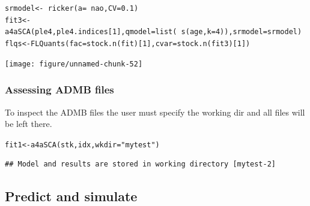 \documentclass[a4paper,english,10pt]{article}\usepackage[]{graphicx}\usepackage[]{color}
\makeatletter
\newcommand{\hlnum}[1]{\textcolor[rgb]{0.2,0.2,0.2}{#1}}%
\newcommand{\hlstr}[1]{\textcolor[rgb]{0.2,0.2,0.2}{#1}}%
\newcommand{\hlopt}[1]{\textcolor[rgb]{0.2,0.2,0.2}{#1}}%
\newcommand{\hlstd}[1]{\textcolor[rgb]{0,0,0}{#1}}%
\newcommand{\hlkwb}[1]{\textcolor[rgb]{0.361,0.506,0.596}{#1}}%
\newcommand{\hlkwc}[1]{\textcolor[rgb]{0.361,0.506,0.596}{#1}}%
\newcommand{\hlkwd}[1]{\textcolor[rgb]{0.361,0.506,0.596}{#1}}%
\newenvironment{kframe}{%
 \def\at@end@of@kframe{}%
 \ifinner\ifhmode%
  \def\at@end@of@kframe{\end{minipage}}%
  \begin{minipage}{\columnwidth}%
 \fi\fi%
 \def\FrameCommand##1{\hskip\@totalleftmargin \hskip-\fboxsep
 \colorbox{shadecolor}{##1}\hskip-\fboxsep
     \hskip-\linewidth \hskip-\@totalleftmargin \hskip\columnwidth}%
 \MakeFramed {\advance\hsize-\width
   \@totalleftmargin\z@ \linewidth\hsize
   \@setminipage}}%
 {\par\unskip\endMakeFramed%
 \at@end@of@kframe}
\newenvironment{knitrout}{}{} %
\makeatother
\begin{document}
\begin{knitrout}
\color{fgcolor}\begin{kframe}
\begin{alltt}
\hlstd{srmodel} \hlkwb{<-} \hlopt{~}\hlkwd{ricker}\hlstd{(}\hlkwc{a} \hlstd{=} \hlopt{~}\hlstd{nao,} \hlkwc{CV} \hlstd{=} \hlnum{0.1}\hlstd{)}
\hlstd{fit3} \hlkwb{<-} \hlkwd{a4aSCA}\hlstd{(ple4, ple4.indices[}\hlnum{1}\hlstd{],} \hlkwc{qmodel} \hlstd{=} \hlkwd{list}\hlstd{(}\hlopt{~}\hlkwd{s}\hlstd{(age,} \hlkwc{k} \hlstd{=} \hlnum{4}\hlstd{)),} \hlkwc{srmodel} \hlstd{= srmodel)}
\hlstd{flqs} \hlkwb{<-} \hlkwd{FLQuants}\hlstd{(}\hlkwc{fac} \hlstd{=} \hlkwd{stock.n}\hlstd{(fit)[}\hlnum{1}\hlstd{],} \hlkwc{cvar} \hlstd{=} \hlkwd{stock.n}\hlstd{(fit3)[}\hlnum{1}\hlstd{])}
\end{alltt}
\end{kframe}
\end{knitrout}


\begin{knitrout}
\color{fgcolor}

{\centering \texttt{[image: figure/unnamed-chunk-52]} 

}



\end{knitrout}


\subsubsection{Assessing ADMB files}

To inspect the ADMB files the user must specify the working dir and all files will be left there.

\begin{knitrout}
\color{fgcolor}\begin{kframe}
\begin{alltt}
\hlstd{fit1} \hlkwb{<-} \hlkwd{a4aSCA}\hlstd{(stk, idx,} \hlkwc{wkdir} \hlstd{=} \hlstr{"mytest"}\hlstd{)}
\end{alltt}
\begin{verbatim}
## Model and results are stored in working directory [mytest-2]
\end{verbatim}
\end{kframe}
\end{knitrout}


\subsection{Predict and simulate}
\end{document}

